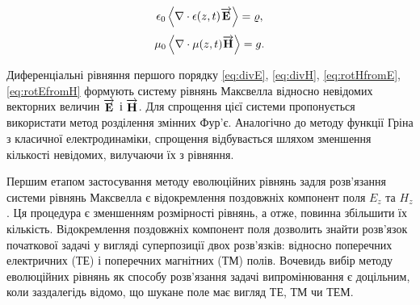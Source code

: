 %
\begin{equation} \label{eq:divE} 
\epsilon_0 \left< \nabla \cdot  \epsilon(z,t) \overrightarrow{\mathbf E}  \right> = \varrho,
\end{equation}
%
\begin{equation} \label{eq:divH}
\mu_0 \left< \nabla \cdot  \mu(z,t) \overrightarrow{\mathbf H}  \right> = g.
\end{equation}

Диференціальні рівняння першого порядку \eqref{eq:divE}, \eqref{eq:divH}, 
\eqref{eq:rotHfromE}, \eqref{eq:rotEfromH} формують систему 
рівнянь Максвелла відносно невідомих векторних величин $ \overrightarrow{\mathbf E} $ і 
$ \overrightarrow{\mathbf H} $. Для спрощення цієї системи пропонується використати метод 
розділення змінних Фур'є. Аналогічно до методу функції Гріна з класичної 
електродинаміки, спрощення відбувається шляхом зменшення кількості невідомих,
вилучаючи їх з рівняння.

Першим етапом застосування методу еволюційних рівнянь задля розв'язання системи
рівнянь Максвелла є відокремлення поздовжніх компонент поля $ E_z $ та $ H_z $.
Ця процедура є зменшенням розмірності рівнянь, а отже, повинна збільшити їх 
кількість. Відокремлення поздовжніх компонент поля дозволить знайти розв'язок 
початкової задачі у вигляді суперпозиції двох розв'язків: відносно поперечних 
електричних (ТЕ) і поперечних магнітних (ТМ) полів. Вочевидь вибір методу 
еволюційних рівнянь як способу розв'язання задачі випромінювання є 
доцільним, коли заздалегідь відомо, що шукане поле має вигляд ТЕ, ТМ чи ТЕМ. 



